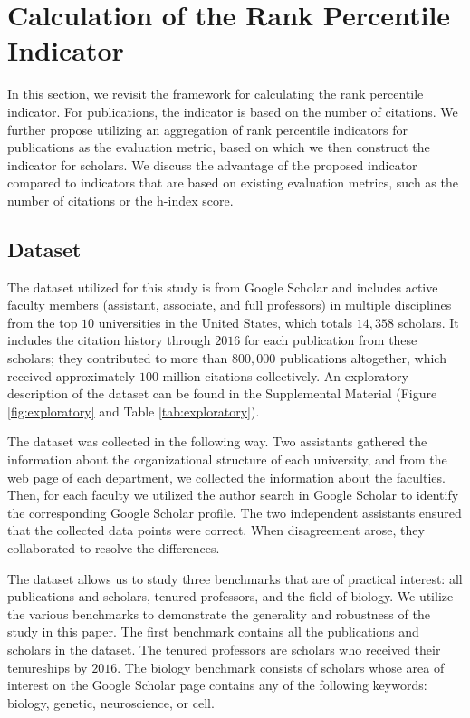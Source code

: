 \section*{Calculation of the Rank Percentile Indicator}

In this section, we revisit the framework for calculating the rank percentile indicator. For publications, the indicator is based on the number of citations. We further propose utilizing an aggregation of rank percentile indicators for publications as the evaluation metric, based on which we then construct the indicator for scholars. We discuss the advantage of the proposed indicator compared to indicators that are based on existing evaluation metrics, such as the number of citations or the h-index score.  

\subsection*{Dataset}

The dataset utilized for this study is from Google Scholar and includes active faculty members (assistant, associate, and full professors) in multiple disciplines from the top $10$ universities in the United States, which totals $14,358$ scholars. It includes the citation history through $2016$ for each publication from these scholars; they contributed to more than $800,000$ publications altogether, which received approximately $100$ million citations collectively. An exploratory description of the dataset can be found in the Supplemental Material (Figure \ref{fig:exploratory} and Table \ref{tab:exploratory}). 

The dataset was collected in the following way. Two assistants gathered the information about the organizational structure of each university, and from the web page of each department, we collected the information about the faculties. Then, for each faculty we utilized the author search in Google Scholar to identify the corresponding Google Scholar profile. The two independent assistants ensured that the collected data points were correct. When disagreement arose, they collaborated to resolve the differences. 

The dataset allows us to study three benchmarks that are of practical interest: all publications and scholars, tenured professors, and the field of biology. We utilize the various benchmarks to demonstrate the generality and robustness of the study in this paper. The first benchmark contains all the publications and scholars in the dataset. The tenured professors are scholars who received their tenureships by $2016$. The biology benchmark consists of scholars whose area of interest on the Google Scholar page contains any of the following keywords: biology, genetic, neuroscience, or cell. 

